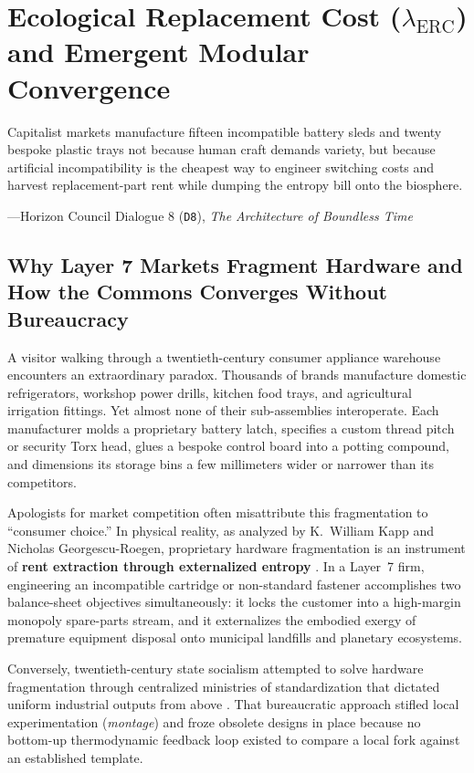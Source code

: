 \chapter{Ecological Replacement Cost ($\lambda_{\mathrm{ERC}}$) and Emergent Modular Convergence}
\label{ch:erc-modular-convergence}

\epigraph{Capitalist markets manufacture fifteen incompatible battery sleds and twenty bespoke plastic trays not because human craft demands variety, but because artificial incompatibility is the cheapest way to engineer switching costs and harvest replacement-part rent while dumping the entropy bill onto the biosphere.}{---Horizon Council Dialogue 8 (\texttt{D8}), \textit{The Architecture of Boundless Time}}

\section{Why Layer 7 Markets Fragment Hardware and How the Commons Converges Without Bureaucracy}
\label{sec:ch2-market-fragmentation}

A visitor walking through a twentieth-century consumer appliance warehouse encounters an extraordinary paradox. Thousands of brands manufacture domestic refrigerators, workshop power drills, kitchen food trays, and agricultural irrigation fittings. Yet almost none of their sub-assemblies interoperate. Each manufacturer molds a proprietary battery latch, specifies a custom thread pitch or security Torx head, glues a bespoke control board into a potting compound, and dimensions its storage bins a few millimeters wider or narrower than its competitors.

Apologists for market competition often misattribute this fragmentation to ``consumer choice.'' In physical reality, as analyzed by K.~William Kapp and Nicholas Georgescu-Roegen, proprietary hardware fragmentation is an instrument of \textbf{rent extraction through externalized entropy} \parencite{kapp1950social,georgescu1971}. In a Layer~7 firm, engineering an incompatible cartridge or non-standard fastener accomplishes two balance-sheet objectives simultaneously: it locks the customer into a high-margin monopoly spare-parts stream, and it externalizes the embodied exergy of premature equipment disposal onto municipal landfills and planetary ecosystems.

Conversely, twentieth-century state socialism attempted to solve hardware fragmentation through centralized ministries of standardization that dictated uniform industrial outputs from above \parencite{scott1998}. That bureaucratic approach stifled local experimentation (\textit{montage}) and froze obsolete designs in place because no bottom-up thermodynamic feedback loop existed to compare a local fork against an established template.

